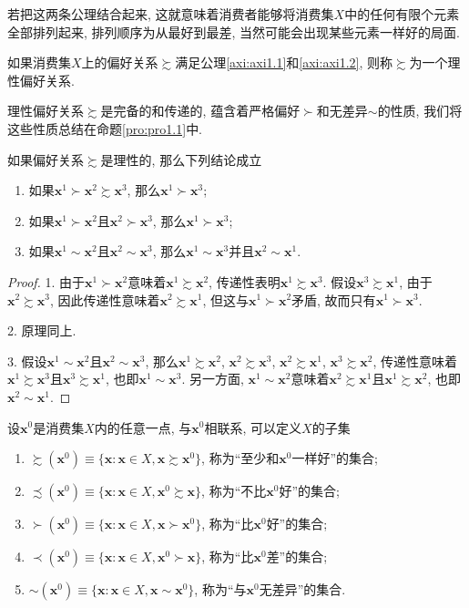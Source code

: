 \documentclass[cn, 12pt, math=mtpro2, bibstyle=apa, blue]{elegantbook}
\newcommand{\x}{\mathbf{x}}
\begin{document}
若把这两条公理结合起来, 这就意味着消费者能够将消费集$X$中的任何有限个元素全部排列起来, 排列顺序为从最好到最差, 当然可能会出现某些元素一样好的局面.
\begin{definition}[理性偏好关系]
如果消费集$X$上的偏好关系$\succsim$满足公理\ref{axi:axi1.1}和\ref{axi:axi1.2}, 则称$\succsim$为一个理性偏好关系.
\end{definition}
理性偏好关系$\succsim$是完备的和传递的, 蕴含着严格偏好$\succ$和无差异$\sim$的性质, 我们将这些性质总结在命题\ref{pro:pro1.1}中.
\begin{proposition}\label{pro:pro1.1}
  如果偏好关系$\succsim$是理性的, 那么下列结论成立
  \begin{enumerate}[\arabic*.]
    \item 如果$\x^1\succ\x^2\succsim\x^3$, 那么$\x^1\succ\x^3$;
    \item 如果$\x^1\succ\x^2$且$\x^2\succ\x^3$, 那么$\x^1\succ\x^3$;
    \item 如果$\x^1\sim\x^2$且$\x^2\sim\x^3$, 那么$\x^1\sim\x^3$并且$\x^2\sim \x^1$.
  \end{enumerate}
\end{proposition}
\begin{proof}
  1. 由于$\x^1\succ\x^2$意味着$\x^1\succsim \x^2$, 传递性表明$\x^1\succsim \x^3$. 假设$\x^3\succsim\x^1$, 由于$\x^2\succsim \x^3$, 因此传递性意味着$\x^2\succsim \x^1$, 但这与$\x^1\succ \x^2$矛盾, 故而只有$\x^1\succ\x^3$.

  2. 原理同上.

  3. 假设$\x^1\sim\x^2$且$\x^2\sim\x^3$, 那么$\x^1\succsim\x^2$, $\x^2\succsim\x^3$, $\x^2\succsim\x^1$, $\x^3\succsim\x^2$, 传递性意味着$\x^1\succsim\x^3$且$\x^3\succsim\x^1$, 也即$\x^1\sim\x^3$. 另一方面, $\x^1\sim \x^2$意味着$\x^2\succsim\x^1$且$\x^1\succsim\x^2$, 也即$\x^2\sim\x^1$.
\end{proof}
\begin{definition}
设$\x^0$是消费集$X$内的任意一点, 与$\x^0$相联系, 可以定义$X$的子集
\begin{enumerate}[label=\arabic*.]
  \item $\succsim(\x^0)\equiv \{\x: \x\in X, \x\succsim\x^0\}$, 称为“至少和$\x^0$一样好”的集合;
  \item $\precsim(\x^0)\equiv \{\x: \x\in X, \x^0\succsim\x\}$, 称为“不比$\x^0$好”的集合;
  \item $\succ(\x^0)\equiv \{\x: \x\in X, \x\succ\x^0\}$, 称为“比$\x^0$好”的集合;
  \item $\prec(\x^0)\equiv \{\x: \x\in X, \x^0\succ \x\}$, 称为“比$\x^0$差”的集合;
  \item $\sim(\x^0)\equiv\{\x: \x\in X, \x\sim \x^0\}$, 称为“与$\x^0$无差异”的集合.
\end{enumerate}
\end{definition}
\end{document}

